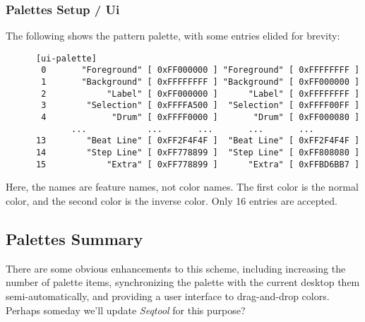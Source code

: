 \subsubsection{Palettes Setup / Ui}
\label{subsubsec:palettes_setup_ui}

   The following shows the pattern palette, with some entries elided for
   brevity:

   \begin{verbatim}
      [ui-palette]
       0       "Foreground" [ 0xFF000000 ] "Foreground" [ 0xFFFFFFFF ]
       1       "Background" [ 0xFFFFFFFF ] "Background" [ 0xFF000000 ]
       2            "Label" [ 0xFF000000 ]      "Label" [ 0xFFFFFFFF ]
       3        "Selection" [ 0xFFFFA500 ]  "Selection" [ 0xFFFF00FF ]
       4             "Drum" [ 0xFFFF0000 ]       "Drum" [ 0xFF000080 ]
             ...            ...       ...       ...       ...
      13        "Beat Line" [ 0xFF2F4F4F ]  "Beat Line" [ 0xFF2F4F4F ]
      14        "Step Line" [ 0xFF778899 ]  "Step Line" [ 0xFF808080 ]
      15            "Extra" [ 0xFF778899 ]      "Extra" [ 0xFFBD6BB7 ]
   \end{verbatim}

   Here, the names are feature names, not color names.  The first color is the
   normal color, and the second color is the inverse color.  Only 16 entries
   are accepted.

\subsection{Palettes Summary}
\label{subsec:palettes_summary}

   There are some obvious enhancements to this scheme, including increasing the
   number of palette items, synchronizing the palette with the current desktop
   them semi-automatically, and providing a user interface to drag-and-drop
   colors.  Perhaps someday we'll update \textsl{Seqtool} for this purpose?

